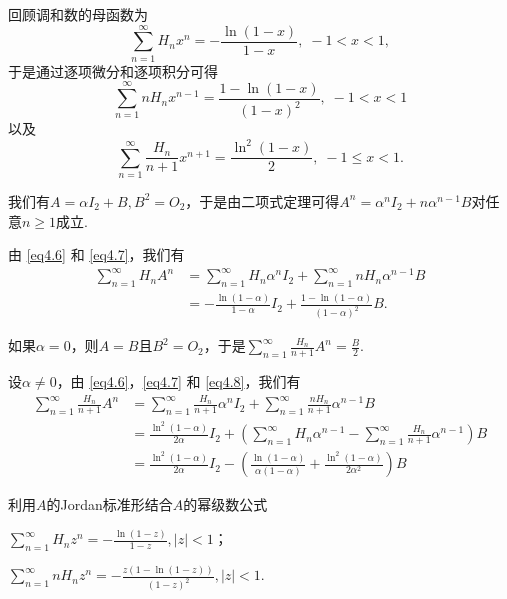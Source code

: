 \begin{solution}
  回顾调和数的母函数为
  \begin{equation}\label{eq4.6}
    \sum_{n=1}^\infty H_nx^n = -\frac{\ln(1-x)}{1-x},\; -1<x<1,
  \end{equation}
  于是通过逐项微分和逐项积分可得
  \begin{equation}\label{eq4.7}
    \sum_{n=1}^\infty nH_nx^{n-1} = \frac{1-\ln(1-x)}{(1-x)^2},\; -1<x<1
  \end{equation}
  以及
  \begin{equation}\label{eq4.8}
    \sum_{n=1}^\infty \frac{H_n}{n+1}x^{n+1} = \frac{\ln^2(1-x)}2,\; -1\le x<1.
  \end{equation}

  我们有$A=\alpha I_2+B,B^2=O_2$，于是由二项式定理可得$A^n=\alpha^nI_2+n\alpha^{n-1}B$对任意$n\ge1$成立.

  \begin{inparaenum}[(a)]
    \item 由 \eqref{eq4.6} 和 \eqref{eq4.7}，我们有
    \begin{align*}
      \sum_{n=1}^\infty H_nA^n & = \sum_{n=1}^\infty H_n\alpha^nI_2 + \sum_{n=1}^\infty nH_n\alpha^{n-1}B \\
      & = - \frac{\ln(1-\alpha)}{1-\alpha}I_2 +
      \frac{1-\ln(1-\alpha)}{(1-\alpha)^2}B.
    \end{align*}

    \item 如果$\alpha=0$，则$A=B$且$B^2=O_2$，于是$
    \sum_{n=1}^\infty\frac{H_n}{n+1}A^n=\frac B2$.

    设$\alpha\ne0$，由 \eqref{eq4.6}，\eqref{eq4.7} 和 \eqref{eq4.8}，我们有
    \begin{align*}
      \sum_{n=1}^\infty \frac{H_n}{n+1}A^n & = \sum_{n=1}^\infty \frac{H_n}{n+1}\alpha^nI_2 + \sum_{n=1}^\infty \frac{nH_n}{n+1}\alpha^{n-1}B \\
      & = \frac{\ln^2(1-\alpha)}{2\alpha}I_2 + \left( \sum_{n=1}^\infty H_n\alpha^{n-1} - \sum_{n=1}^\infty \frac{H_n}{n+1}\alpha^{n-1} \right) B \\
      & = \frac{\ln^2(1-\alpha)}{2\alpha}I_2 - \left( \frac{\ln(1-\alpha)}{\alpha(1-\alpha)} + \frac{\ln^2(1-\alpha)}{2\alpha^2} \right)B
    \end{align*}
  \end{inparaenum}
\end{solution}

\begin{solution}
  利用$A$的Jordan标准形结合$A$的幂级数公式
  \begin{enum}
    \item $\sum_{n=1}^\infty H_nz^n=-\frac{\ln(1-z)}{1-z},|z|<1$；
    \item $\sum_{n=1}^\infty nH_nz^n=-\frac{z\left(1-\ln(1-z)\right)}{
        (1-z)^2},|z|<1$.
  \end{enum}
\end{solution}

